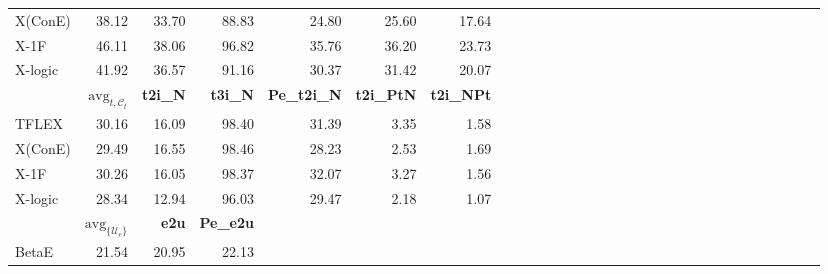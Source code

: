 \begin{table*}
{\begin{tabular}{lrrrrrrrrrrrrrrrrrrrrrrrrrrrrr }
      X(ConE)        & 38.12                            & 33.70            & 88.83            & 24.80               & 25.60             & 17.64                                                                         \\
      X-1F           & 46.11                            & 38.06            & 96.82            & 35.76               & 36.20             & 23.73                                                                         \\
      X-logic        & 41.92                            & 36.57            & 91.16            & 30.37               & 31.42             & 20.07                                                                         \\
      \midrule
      \midrule
                     & $\text{avg}_{t, \mathcal{C}_t}$  & \textbf{t2i\_N}  & \textbf{t3i\_N}  & \textbf{Pe\_t2i\_N} & \textbf{t2i\_PtN} & \textbf{t2i\_NPt}                                                             \\
      \midrule
      TFLEX          & 30.16                            & 16.09            & 98.40            & 31.39               & 3.35              & 1.58                                                                          \\
      X(ConE)        & 29.49                            & 16.55            & 98.46            & 28.23               & 2.53              & 1.69                                                                          \\
      X-1F           & 30.26                            & 16.05            & 98.37            & 32.07               & 3.27              & 1.56                                                                          \\
      X-logic        & 28.34                            & 12.94            & 96.03            & 29.47               & 2.18              & 1.07                                                                          \\
      \midrule
      \midrule
                     & $\text{avg}_{\{\mathcal{U}_e\}}$ & \textbf{e2u}     & \textbf{Pe\_e2u}                                                                                                                           \\
      \midrule
      BetaE          & 21.54                            & 20.95            & 22.13                                                                                                                                      \\

\end{tabular}}
\end{table*}
